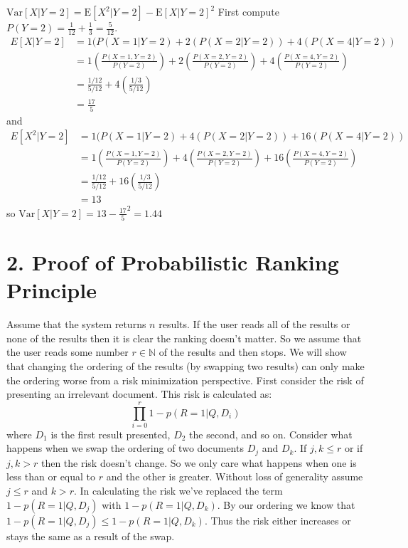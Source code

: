 \documentclass[paper=a4, fontsize=11pt]{jhwhw} %
\begin{document}
\begin{enumerate}
        $\mathrm{Var}[X|Y = 2] = \mathrm{E}[X^2|Y = 2] - \mathrm{E}[X|Y = 2]^2$
        First compute $P(Y = 2) = \frac{1}{12} + \frac{1}{3} = \frac{5}{12}$.
        \begin{align*}
            E[X|Y = 2] &= 1(P(X = 1|Y = 2) + 2(P(X = 2| Y = 2)) + 4(P(X = 4|Y = 2))\\
                       &= 1(\frac{P(X = 1, Y = 2)}{P(Y = 2)}) + 2(\frac{P(X = 2, Y = 2)}{P(Y = 2)}) + 4(\frac{P(X = 4, Y = 2)}{P(Y = 2)})\\
                       &= \frac{1/12}{5/12} + 4(\frac{1/3}{5/12})\\
                       &= \frac{17}{5}
        \end{align*}
        and
        \begin{align*}
            E[X^2|Y = 2] &= 1(P(X = 1|Y = 2) + 4(P(X = 2| Y = 2)) + 16(P(X = 4|Y = 2))\\
                       &= 1(\frac{P(X = 1, Y = 2)}{P(Y = 2)}) + 4(\frac{P(X = 2, Y = 2)}{P(Y = 2)}) + 16(\frac{P(X = 4, Y = 2)}{P(Y = 2)})\\
                       &= \frac{1/12}{5/12} + 16(\frac{1/3}{5/12})\\
                       &= 13
        \end{align*}
        so $\mathrm{Var}[X|Y = 2] = 13 - \frac{17}{5}^2 = 1.44$
\end{enumerate}
\solution
\section*{2. Proof of Probabilistic Ranking Principle}
\solution
Assume that the system returns $n$ results. If the user reads all of the results or none of the results then it is clear the ranking doesn't matter. So we assume that the user reads some number $r\in \mathbb N$ of the results and then stops. We will show that changing the ordering of the results (by swapping two results) can only make the ordering worse from a risk minimization perspective. First consider the risk of presenting an irrelevant document. This risk is calculated as:
$$\prod_{i=0}^{r} 1 - p(R = 1|Q, D_i)$$
where $D_1$ is the first result presented, $D_2$ the second, and so on. Consider what happens when we swap the ordering of two documents $D_j$ and $D_k$. If $j, k \le r$ or if $j, k > r$ then the risk doesn't change. So we only care what happens when one is less than or equal to $r$ and the other is greater. Without loss of generality assume $j \le r$ and $k > r$. In calculating the risk we've replaced the term $1 - p(R = 1|Q, D_j)$ with $1 - p(R = 1| Q, D_k)$. By our ordering we know that $1 - p(R = 1|Q, D_j) \le 1 - p(R = 1|Q, D_k)$. Thus the risk either increases or stays the same as a result of the swap.
\end{document}
